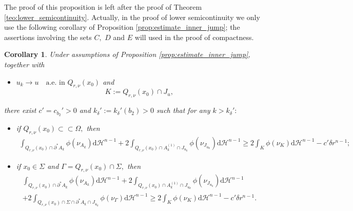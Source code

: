 \documentclass[reqno]{amsart}
\numberwithin{equation}{section}
\theoremstyle{plain}
\newtheorem{corollary}[theorem]{Corollary}
\theoremstyle{definition}
\newcommand{\cH}{\mathcal{H}}
\newcommand{\p}{\partial}
\newcommand{\bound}{b}
\renewcommand{\d}{\mathrm{d}}
\newcommand{\strictlyincluded}{\subset\subset}
\begin{document}
The proof of this proposition is left after the proof of Theorem \ref{teo:lower_semicontinuity}.  Actually, in the proof of lower semicontinuity we only use the following corollary of Proposition \ref{prop:estimate_inner_jump}; the assertions involving the sets $C,$ $D$ and $E$ will used in the proof of compactness.

\begin{corollary}\label{cor:further_estimates}
Under assumptions of Proposition \ref{prop:estimate_inner_jump}, together with 
%
\begin{itemize}[left=20pt]
\item[\rm(a6)] $u_k\to u\quad\text{a.e.\  in $Q_{r,\nu}(x_0)$}$
and  
$$
K:=Q_{r,\nu}(x_0)\cap J_u,
$$ 
\end{itemize}
%
there exist $c'=c_{\bound_2}'>0$ and $k_\delta':=k_\delta'(\bound_2)>0$ such that for any $k>k_\delta':$

\begin{itemize}[left=17pt]
\item[\rm(i)]  if $Q_{r,\nu}(x_0)\strictlyincluded \Omega,$ then 
%
\begin{align*}
\int_{Q_{r,\nu}(x_0) \cap\p^*A_k} \phi(\nu_{A_k})\d\cH^{n-1} +   2\int_{Q_{r,\nu}(x_0) \cap A_k^{(1)} \cap J_{u_k}}   \phi(\nu_{J_{u_k}}) \d\cH^{n-1}
\ge  2\int_K\phi(\nu_K)\d\cH^{n-1} - c'\delta r^{n-1} ;
\end{align*}

\item[\rm(ii)] if $x_0\in \Sigma$ and $\Gamma = Q_{r,\nu}(x_0)\cap \Sigma,$ then 
\begin{multline*}\int_{Q_{r,\nu}(x_0)\cap\p^*A_k} \phi(\nu_{A_k})\d\cH^{n-1} +   2\int_{Q_{r,\nu}(x_0) \cap A_k^{(1)} \cap J_{u_k}} \phi(\nu_{J_{u_k}}) \d\cH^{n-1} \\ 
+ 2\int_{Q_{r,\nu}(x_0)\cap \Sigma\cap \p^*A_k\cap J_{u_k}} \phi(\nu_\Gamma)\d\cH^{n-1} 
\ge2\int_K\phi(\nu_K)\d\cH^{n-1} - c'\delta r^{n-1} .
\end{multline*}
\end{itemize}

\end{corollary}
\end{document}
